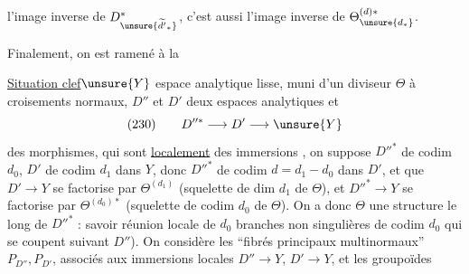  l'image inverse de $D^{*}_{\unsure{\widetilde{d'}_*}}$, c'est aussi l'image inverse de $\Theta^{(d)*}_{\unsure{d_*}}$.


Finalement, on est ramené à la

\uline{Situation clef}\quad $\unsure{Y}$ espace analytique lisse, muni d'un diviseur $\Theta$ à croisements normaux, $D''$ et $D'$ deux espaces analytiques  et
\[
(230)\qquad D''^{*}\longrightarrow D'\longrightarrow \unsure{Y}
\]
des morphismes, qui sont \uline{localement} des immersions , on suppose $D''^{*}$ de codim $d_0$, $D'$ de codim $d_1$ dans $Y$, donc $D''^{*}$ de codim $d=d_1-d_0$ dans $D'$, et que $D'\to Y$ se factorise par $\Theta^{(d_1)}$ (squelette de dim $d_1$ de $\Theta$),  et $D''^{*}\to Y$ se factorise par $\Theta^{(d_0)*}$ (squelette  de codim $d_0$ de $\Theta$).  On a donc $\Theta$ une structure  le long de $D''^{*}$ : savoir réunion locale de $d_0$ branches non singulières  de codim $d_0$ qui se coupent suivant $D''$). On considère les ``fibrés principaux multinormaux'' $P_{D''},P_{D'}$, associés aux immersions locales $D''\to Y$, $D'\to Y$, et les groupoïdes

